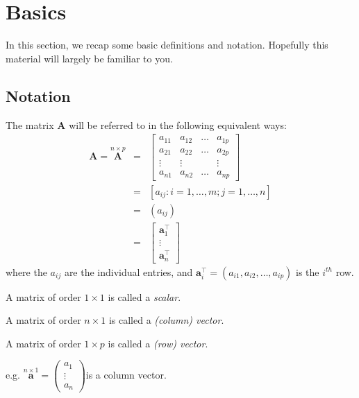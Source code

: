 \documentclass[]{book}
\theoremstyle{definition}
\theoremstyle{definition}
\theoremstyle{definition}
\theoremstyle{remark}
\begin{document}
\renewcommand{\tcov}{\text{cov}}
\renewcommand{\texp}{\text{exp}}
\renewcommand{\lb}{\left(}
\renewcommand{\rb}{\right)}
\renewcommand{\lsb}{\left[}
\renewcommand{\rsb}{\right]}

\hypertarget{linalg-basics}{%
\section{Basics}\label{linalg-basics}}

In this section, we recap some basic definitions and notation. Hopefully this material will largely be familiar to you.

\hypertarget{notation-1}{%
\subsection{Notation}\label{notation-1}}

The matrix \({\mathbf A}\) will be referred to in the following equivalent ways:
\begin{eqnarray*}
{\mathbf A}=\stackrel{n\times p}{\mathbf A} &=& \left[\begin{array}{cccc}
a_{11}&a_{12}&\dots&a_{1p}\\
a_{21}&a_{22}&\dots&a_{2p}\\
\vdots&\vdots&&\vdots\\
a_{n1}&a_{n2}&\dots&a_{np}
\end{array} \right] \\
&=&[a_{ij}: i=1, \ldots , m; j=1, \ldots , n]\\
&=&(a_{ij})\\
&=& \left[ \begin{array}{c}\boldsymbol a_1^\top\\
\vdots\\
\boldsymbol a_n^\top\end{array}\right]
\end{eqnarray*}
where the \(a_{ij}\) are the individual entries, and \(\boldsymbol a_i^\top=(a_{i1}, a_{i2}, \ldots, a_{ip})\) is the \(i^{th}\) row.

A matrix of order \(1\times 1\) is called a \emph{scalar}.

A matrix of order \(n\times 1\) is called a \emph{(column) vector}.

A matrix of order \(1\times p\) is called a \emph{(row) vector}.

e.g. \(\stackrel{n\times 1}{\mathbf a}=\left( \begin{array}{c} a_1\\\vdots\\a_n \end{array} \right)\)\quad is a column vector.
\end{document}

